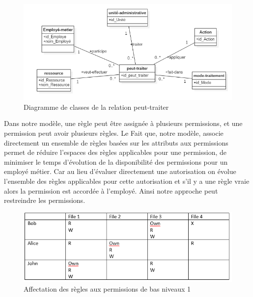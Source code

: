 \begin{figure}[h!]
    \centering
		\includegraphics[scale=0.7]{chap3/images/peut-traiter.png}
    \caption{Diagramme de classes de la relation peut-traiter}
	 \label{figpeut-traiter}
\end{figure} 


\label{sectionAttributionReglePermission}

Dans notre modèle, une règle peut être assignée à plusieurs permissions, et une permission peut avoir plusieurs règles. Le Fait que, notre modèle, associe directement un ensemble de règles basées sur les attributs aux permissions permet de réduire l'espaces des règles applicables pour une permission, de minimiser le temps d'évolution de la disponibilité des permissions pour un  employé métier. Car au lieu  d'évaluer directement une autorisation on évolue l'ensemble des règles applicables pour cette autorisation et s'il y a une règle vraie alors la permission est accordée à l'employé.  Ainsi notre approche peut restreindre les permissions. 

\begin{figure}[h!]
    \centering
		\includegraphics[scale=0.7]{chap2/images/ACM.png}
    \caption{Affectation des règles aux permissions de bas niveaux 1}
	 \label{figAcm}
\end{figure} 

